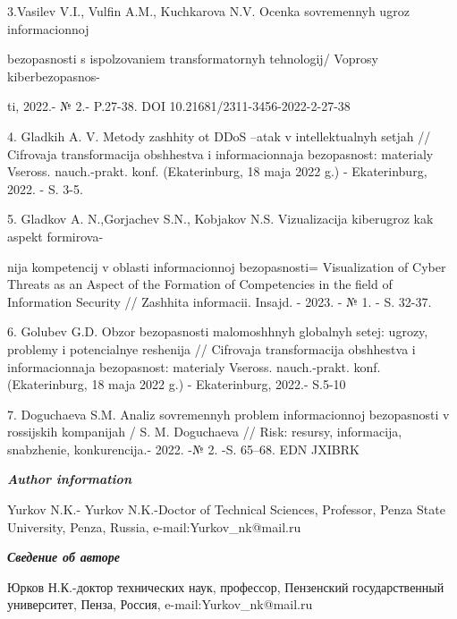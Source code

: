 3.Vasil\textquotesingle ev V.I., Vul\textquotesingle fin A.M.,
Kuchkarova N.V. Ocenka sovremennyh ugroz informacionnoj

bezopasnosti s ispol\textquotesingle zovaniem transformatornyh
tehnologij/ Voprosy kiberbezopasnos-

ti, 2022.- № 2.- P.27-38. DOI 10.21681/2311-3456-2022-2-27-38

4. Gladkih A. V. Metody zashhity ot DDoS --atak v
intellektual\textquotesingle nyh setjah // Cifrovaja transformacija
obshhestva i informacionnaja bezopasnost\textquotesingle: materialy
Vseross. nauch.-prakt. konf. (Ekaterinburg, 18 maja 2022 g.) -
Ekaterinburg, 2022. - S. 3-5.

5. Gladkov A. N.,Gorjachev S.N., Kobjakov N.S. Vizualizacija kiberugroz
kak aspekt formirova-

nija kompetencij v oblasti informacionnoj bezopasnosti= Visualization of
Cyber Threats as an Aspect of the Formation of Competencies in the field
of Information Security // Zashhita informacii. Insajd. - 2023. - № 1. -
S. 32-37.

6. Golubev G.D. Obzor bezopasnosti malomoshhnyh
global\textquotesingle nyh setej: ugrozy, problemy i
potencial\textquotesingle nye reshenija // Cifrovaja transformacija
obshhestva i informacionnaja bezopasnost\textquotesingle: materialy
Vseross. nauch.-prakt. konf. (Ekaterinburg, 18 maja 2022 g.) -
Ekaterinburg, 2022.- S.5-10

7. Doguchaeva S.M. Analiz sovremennyh problem informacionnoj
bezopasnosti v rossijskih kompanijah / S. M. Doguchaeva // Risk:
resursy, informacija, snabzhenie, konkurencija.- 2022. -№ 2. -S. 65--68.
EDN JXIBRK~

\emph{\textbf{Author information}}

Yurkov N.K.- Yurkov N.K.-Doctor of Technical Sciences, Professor, Penza
State University, Penza, Russia, e-mail:Yurkov\_nk@mail.ru

\emph{\textbf{Сведение об авторе}}

Юрков Н.К.-доктор технических наук, профессор, Пензенский
государственный университет, Пенза, Россия, e-mail:Yurkov\_nk@mail.ru

